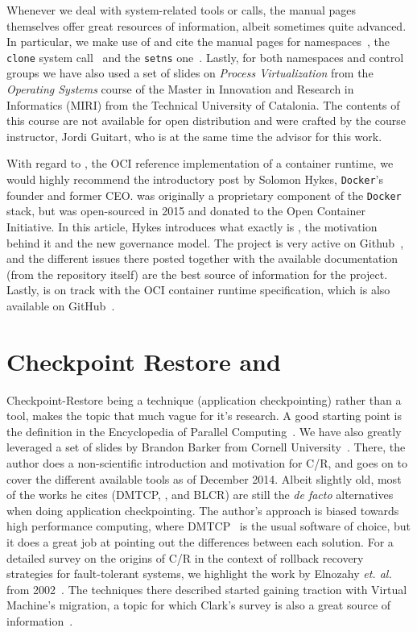 Whenever we deal with system-related tools or calls, the manual pages themselves offer great resources of information, albeit sometimes quite advanced.
In particular, we make use of and cite the manual pages for namespaces~\cite{namespaces-manual}, the \texttt{clone} system call~\cite{clone-manual} and the \texttt{setns} one~\cite{setns-manual}.
Lastly, for both namespaces and control groups we have also used a set of slides on \textit{Process Virtualization} from the \textit{Operating Systems} course of the Master in Innovation and Research in Informatics (MIRI) from the Technical University of Catalonia.
The contents of this course are not available for open distribution and were crafted by the course instructor, Jordi Guitart, who is at the same time the advisor for this work.

With regard to \runc, the OCI reference implementation of a container runtime, we would highly recommend the introductory post by Solomon Hykes, \texttt{Docker}'s founder and former CEO.
\runc was originally a proprietary component of the \texttt{Docker} stack, but was open-sourced in 2015 and donated to the Open Container Initiative.
In this article, Hykes introduces what exactly is \runc, the motivation behind it and the new governance model.
The project is very active on Github~\cite{runc-memtrack}, and the different issues there posted together with the available documentation (from the repository itself) are the best source of information for the project.
Lastly, \runc is on track  with the OCI container runtime specification, which is also available on GitHub~\cite{runc-spec}.

\section{Checkpoint Restore and \criu} \label{sec:rw-criu}

Checkpoint-Restore being a technique (application checkpointing) rather than a tool, makes the topic that much vague for it's research.
A good starting point is the definition in the Encyclopedia of Parallel Computing~\cite{Schulz2011}.
We have also greatly leveraged a set of slides by Brandon Barker from Cornell University~\cite{Barker2014}.
There, the author does a non-scientific introduction and motivation for C/R, and goes on to cover the different available tools as of December 2014.
Albeit slightly old, most of the works he cites (DMTCP, \criu, and BLCR) are still the \textit{de facto} alternatives when doing application checkpointing.
The author's approach is biased towards high performance computing, where DMTCP~\cite{dmtcp} is the usual software of choice, but it does a great job at pointing out the differences between each solution.
For a detailed survey on the origins of C/R in the context of rollback recovery strategies for fault-tolerant systems, we highlight the work by Elnozahy \textit{et. al.} from 2002~\cite{Elnozahy2002}.
The techniques there described started gaining traction with Virtual Machine's migration, a topic for which Clark's survey is also a great source of information~\cite{Clark2005}.

